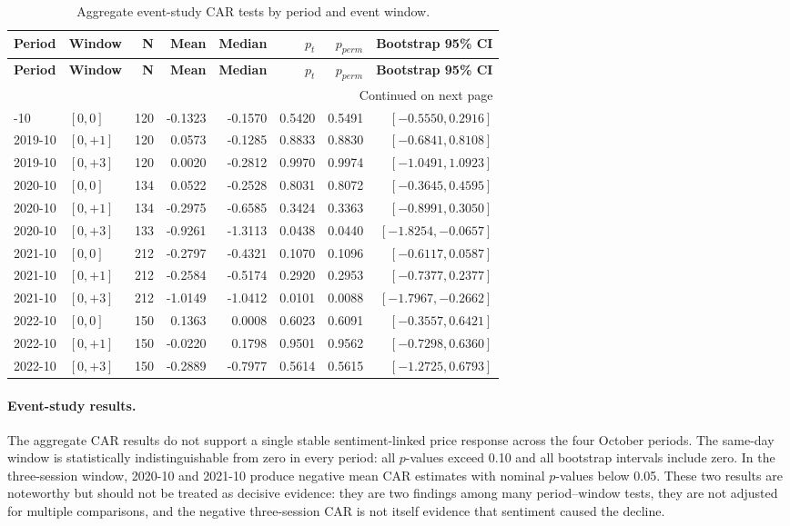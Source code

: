 \documentclass[12pt,a4paper]{article}
\begin{document}
\begin{longtable}{llrrrrrr}
\caption{Aggregate event-study CAR tests by period and event window.}\label{tab:multi-year-car-tests}\\
\toprule
\textbf{Period} & \textbf{Window} & \textbf{N} & \textbf{Mean} & \textbf{Median} & \textbf{$p_t$} & \textbf{$p_{perm}$} & \textbf{Bootstrap 95\% CI} \\
\midrule
\endfirsthead
\toprule
\textbf{Period} & \textbf{Window} & \textbf{N} & \textbf{Mean} & \textbf{Median} & \textbf{$p_t$} & \textbf{$p_{perm}$} & \textbf{Bootstrap 95\% CI} \\
\midrule
\endhead
\midrule
\multicolumn{8}{r}{Continued on next page}\\
\endfoot
\bottomrule
\endlastfoot
2019-10 & $[0,0]$ & 120 & -0.1323 & -0.1570 & 0.5420 & 0.5491 & $[-0.5550,0.2916]$ \\
2019-10 & $[0,+1]$ & 120 & 0.0573 & -0.1285 & 0.8833 & 0.8830 & $[-0.6841,0.8108]$ \\
2019-10 & $[0,+3]$ & 120 & 0.0020 & -0.2812 & 0.9970 & 0.9974 & $[-1.0491,1.0923]$ \\
2020-10 & $[0,0]$ & 134 & 0.0522 & -0.2528 & 0.8031 & 0.8072 & $[-0.3645,0.4595]$ \\
2020-10 & $[0,+1]$ & 134 & -0.2975 & -0.6585 & 0.3424 & 0.3363 & $[-0.8991,0.3050]$ \\
2020-10 & $[0,+3]$ & 133 & -0.9261 & -1.3113 & 0.0438 & 0.0440 & $[-1.8254,-0.0657]$ \\
2021-10 & $[0,0]$ & 212 & -0.2797 & -0.4321 & 0.1070 & 0.1096 & $[-0.6117,0.0587]$ \\
2021-10 & $[0,+1]$ & 212 & -0.2584 & -0.5174 & 0.2920 & 0.2953 & $[-0.7377,0.2377]$ \\
2021-10 & $[0,+3]$ & 212 & -1.0149 & -1.0412 & 0.0101 & 0.0088 & $[-1.7967,-0.2662]$ \\
2022-10 & $[0,0]$ & 150 & 0.1363 & 0.0008 & 0.6023 & 0.6091 & $[-0.3557,0.6421]$ \\
2022-10 & $[0,+1]$ & 150 & -0.0220 & 0.1798 & 0.9501 & 0.9562 & $[-0.7298,0.6360]$ \\
2022-10 & $[0,+3]$ & 150 & -0.2889 & -0.7977 & 0.5614 & 0.5615 & $[-1.2725,0.6793]$ \\
\end{longtable}

\paragraph{Event-study results.}
The aggregate CAR results do not support a single stable sentiment-linked price response across the four October periods. The same-day window is statistically indistinguishable from zero in every period: all $p$-values exceed 0.10 and all bootstrap intervals include zero. In the three-session window, 2020-10 and 2021-10 produce negative mean CAR estimates with nominal $p$-values below 0.05. These two results are noteworthy but should not be treated as decisive evidence: they are two findings among many period--window tests, they are not adjusted for multiple comparisons, and the negative three-session CAR is not itself evidence that sentiment caused the decline.
\end{document}
